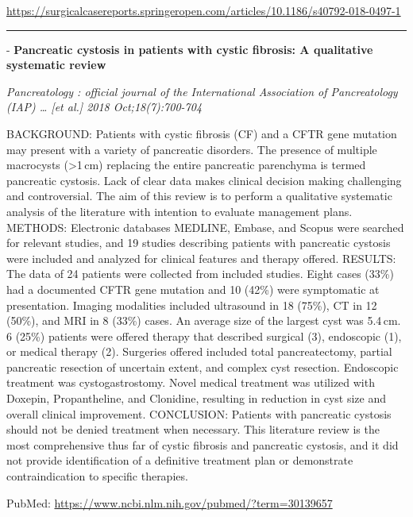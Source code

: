 \documentclass[]{article}
\begin{document}
\url{https://surgicalcasereports.springeropen.com/articles/10.1186/s40792-018-0497-1}

\begin{center}\rule{0.5\linewidth}{\linethickness}\end{center}

 - \textbf{Pancreatic cystosis in patients with cystic fibrosis: A
qualitative systematic review}

\emph{Pancreatology : official journal of the International Association
of Pancreatology (IAP) \ldots{} {[}et al.{]} 2018 Oct;18(7):700-704}

BACKGROUND: Patients with cystic fibrosis (CF) and a CFTR gene mutation
may present with a variety of pancreatic disorders. The presence of
multiple macrocysts (\textgreater{}1\,cm) replacing the entire
pancreatic parenchyma is termed pancreatic cystosis. Lack of clear data
makes clinical decision making challenging and controversial. The aim of
this review is to perform a qualitative systematic analysis of the
literature with intention to evaluate management plans. METHODS:
Electronic databases MEDLINE, Embase, and Scopus were searched for
relevant studies, and 19 studies describing patients with pancreatic
cystosis were included and analyzed for clinical features and therapy
offered. RESULTS: The data of 24 patients were collected from included
studies. Eight cases (33\%) had a documented CFTR gene mutation and 10
(42\%) were symptomatic at presentation. Imaging modalities included
ultrasound in 18 (75\%), CT in 12 (50\%), and MRI in 8 (33\%) cases. An
average size of the largest cyst was 5.4\,cm. 6 (25\%) patients were
offered therapy that described surgical (3), endoscopic (1), or medical
therapy (2). Surgeries offered included total pancreatectomy, partial
pancreatic resection of uncertain extent, and complex cyst resection.
Endoscopic treatment was cystogastrostomy. Novel medical treatment was
utilized with Doxepin, Propantheline, and Clonidine, resulting in
reduction in cyst size and overall clinical improvement. CONCLUSION:
Patients with pancreatic cystosis should not be denied treatment when
necessary. This literature review is the most comprehensive thus far of
cystic fibrosis and pancreatic cystosis, and it did not provide
identification of a definitive treatment plan or demonstrate
contraindication to specific therapies.

PubMed: \url{https://www.ncbi.nlm.nih.gov/pubmed/?term=30139657}

{}

{}
\end{document}
